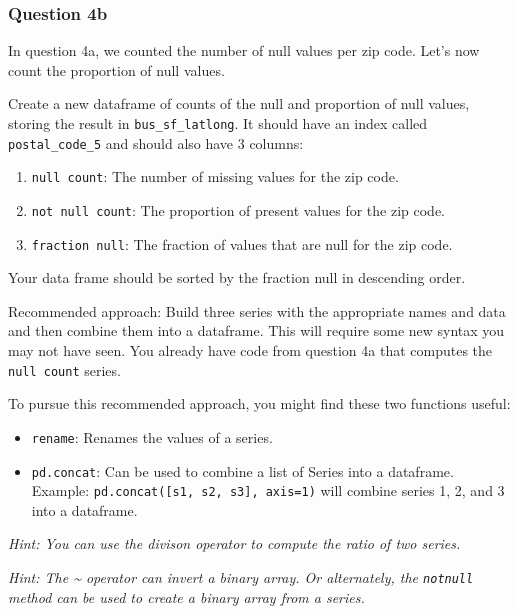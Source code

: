 \documentclass[11pt]{article}
\providecommand{\tightlist}{%
      \setlength{\itemsep}{0pt}\setlength{\parskip}{0pt}}
\begin{document}
    \subsubsection{Question 4b}\label{question-4b}

In question 4a, we counted the number of null values per zip code. Let's
now count the proportion of null values.

Create a new dataframe of counts of the null and proportion of null
values, storing the result in \texttt{bus\_sf\_latlong}. It should have
an index called \texttt{postal\_code\_5} and should also have 3 columns:

\begin{enumerate}
\def\labelenumi{\arabic{enumi}.}
\tightlist
\item
  \texttt{null\ count}: The number of missing values for the zip code.
\item
  \texttt{not\ null\ count}: The proportion of present values for the
  zip code.
\item
  \texttt{fraction\ null}: The fraction of values that are null for the
  zip code.
\end{enumerate}

Your data frame should be sorted by the fraction null in descending
order.

Recommended approach: Build three series with the appropriate names and
data and then combine them into a dataframe. This will require some new
syntax you may not have seen. You already have code from question 4a
that computes the \texttt{null\ count} series.

To pursue this recommended approach, you might find these two functions
useful:

\begin{itemize}
\tightlist
\item
  \texttt{rename}: Renames the values of a series.
\item
  \texttt{pd.concat}: Can be used to combine a list of Series into a
  dataframe. Example: \texttt{pd.concat({[}s1,\ s2,\ s3{]},\ axis=1)}
  will combine series 1, 2, and 3 into a dataframe.
\end{itemize}

\emph{Hint: You can use the divison operator to compute the ratio of two
series.}

\emph{Hint: The \textasciitilde{} operator can invert a binary array. Or
alternately, the \texttt{notnull} method can be used to create a binary
array from a series.}
\end{document}
